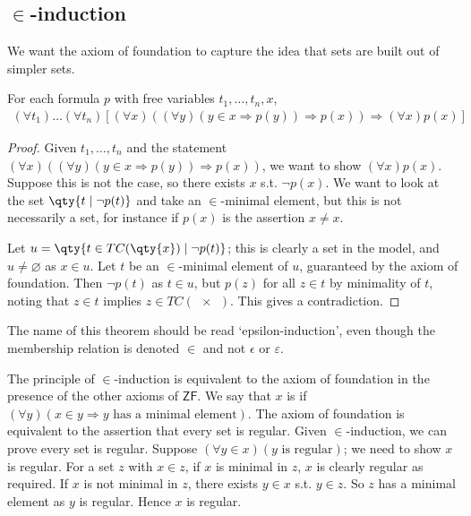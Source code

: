 \subsection{\texorpdfstring{$\in$}{∈}-induction}
We want the axiom of foundation to capture the idea that sets are built out of simpler sets.
\begin{theorem}
    For each formula $p$ with free variables $t_1, \dots, t_n, x$,
    \begin{align*}
        (\forall t_1)\dots(\forall t_n)[(\forall x)((\forall y)(y \in x \Rightarrow p(y)) \Rightarrow p(x)) \Rightarrow (\forall x)p(x)]
    \end{align*}
\end{theorem}
\begin{proof}
    Given $t_1, \dots, t_n$ and the statement $(\forall x)((\forall y)(y \in x \Rightarrow p(y)) \Rightarrow p(x))$, we want to show $(\forall x)p(x)$.
    Suppose this is not the case, so there exists $x$ s.t. $\neg p(x)$.
    We want to look at the set $\qty{t \mid \neg p(t)}$ and take an $\in$-minimal element, but this is not necessarily a set, for instance if $p(x)$ is the assertion $x \neq x$.

    Let $u = \qty{t \in TC(\qty{x}) \mid \neg p(t)}$; this is clearly a set in the model, and $u \neq \varnothing$ as $x \in u$.
    Let $t$ be an $\in$-minimal element of $u$, guaranteed by the axiom of foundation.
    Then $\neg p(t)$ as $t \in u$, but $p(z)$ for all $z \in t$ by minimality of $t$, noting that $z \in t$ implies $z \in TC(\qty{x})$.
    This gives a contradiction.
\end{proof}
The name of this theorem should be read `epsilon-induction', even though the membership relation is denoted $\in$ and not $\epsilon$ or $\varepsilon$.

The principle of $\in$-induction is equivalent to the axiom of foundation in the presence of the other axioms of $\mathsf{ZF}$.
We say that $x$ is  if $(\forall y)(x \in y \Rightarrow y \text{ has a minimal element})$.
The axiom of foundation is equivalent to the assertion that every set is regular.
Given $\in$-induction, we can prove every set is regular.
Suppose $(\forall y \in x)(y \text{ is regular})$; we need to show $x$ is regular.
For a set $z$ with $x \in z$, if $x$ is minimal in $z$, $x$ is clearly regular as required.
If $x$ is not minimal in $z$, there exists $y \in x$ s.t. $y \in z$.
So $z$ has a minimal element as $y$ is regular.
Hence $x$ is regular.

